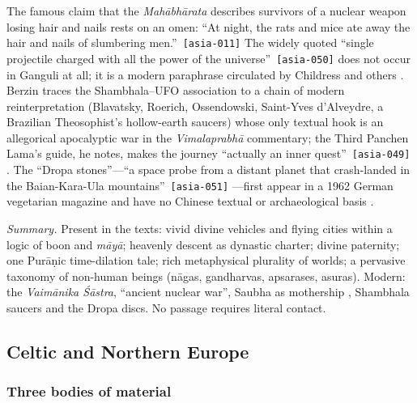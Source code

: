 \documentclass[11pt,a4paper]{article}
\newcommand{\pid}[1]{\texttt{\small #1}}
\begin{document}
The famous claim that the \emph{Mahābhārata} describes survivors of a nuclear weapon losing hair and nails rests on an omen: \enquote{At night, the rats and mice ate away the hair and nails of slumbering men.}~\pid{[asia-011]} The widely quoted \enquote{single projectile charged with all the power of the universe}~\pid{[asia-050]} does not occur in Ganguli at all; it is a modern paraphrase circulated by Childress and others \parencite{childress_aircraft}. Berzin traces the Shambhala--UFO association to a chain of modern reinterpretation (Blavatsky, Roerich, Ossendowski, Saint-Yves d'Alveydre, a Brazilian Theosophist's hollow-earth saucers) whose only textual hook is an allegorical apocalyptic war in the \emph{Vimalaprabhā} commentary; the Third Panchen Lama's guide, he notes, makes the journey \enquote{actually an inner quest}~\pid{[asia-049]} \parencite{berzin2003mistaken}. The ``Dropa stones''---\enquote{a space probe from a distant planet that crash-landed in the Baian-Kara-Ula mountains}~\pid{[asia-051]} \parencite{hausdorf1998dropa}---first appear in a 1962 German vegetarian magazine and have no Chinese textual or archaeological basis \parencite{creighton1973book,fitzpatrickmatthews_dropa}.

\emph{Summary.} Present in the texts: vivid divine vehicles and flying cities within a logic of boon and \emph{māyā}; heavenly descent as dynastic charter; divine paternity; one Purāṇic time-dilation tale; rich metaphysical plurality of worlds; a pervasive taxonomy of non-human beings (nāgas, gandharvas, apsarases, asuras). Modern: the \emph{Vaimānika Śāstra}, ``ancient nuclear war'', Saubha as mothership \parencite{thompson1993alien}, Shambhala saucers and the Dropa discs. No passage requires literal contact.

\subsection{Celtic and Northern Europe}\label{sec:celtic}

\subsubsection{Three bodies of material}
\end{document}
